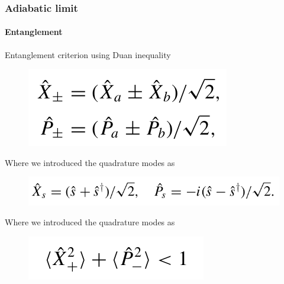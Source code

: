 \documentclass[aspectratio=43]{beamer}
\begin{document}
\begin{frame}
	
	\frametitle{Adiabatic limit}
	\framesubtitle{Entanglement}
	
	Entanglement criterion using Duan inequality 
	\begin{figure}
		\includegraphics[width = 4 cm]{plots/entanglement_quad.png}
	\end{figure}	
	
	Where we introduced the quadrature modes as
	\begin{figure}
		\includegraphics[width = 6.5 cm]{plots/entanglement_quad_2.png}
	\end{figure}

	Where we introduced the quadrature modes as
	\begin{figure}
		\includegraphics[width = 4 cm]{plots/entanglement_duan_criterion.png}
	\end{figure}

\end{frame}
\end{document}
